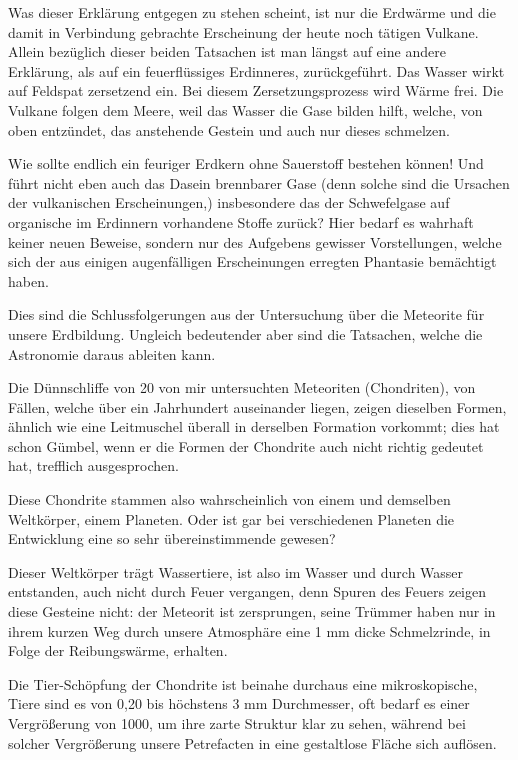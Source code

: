\documentclass[a4paper, 12pt, oneside]{article}
\begin{document}
Was dieser Erklärung entgegen zu stehen scheint, ist nur die Erdwärme und die damit in Verbindung gebrachte Erscheinung der heute noch tätigen Vulkane. Allein bezüglich dieser beiden Tatsachen ist man längst auf eine andere Erklärung, als auf ein feuerflüssiges Erdinneres, zurückgeführt. Das Wasser wirkt auf Feldspat zersetzend ein. Bei diesem Zersetzungsprozess wird Wärme frei. Die Vulkane folgen dem Meere, weil das Wasser die Gase bilden hilft, welche, von oben entzündet, das anstehende Gestein und auch nur dieses schmelzen.

Wie sollte endlich ein feuriger Erdkern ohne Sauerstoff bestehen können! Und führt nicht eben auch das Dasein brennbarer Gase (denn solche sind die Ursachen der vulkanischen Erscheinungen,) insbesondere das der Schwefelgase auf organische im Erdinnern vorhandene Stoffe zurück? Hier bedarf es wahrhaft keiner neuen Beweise, sondern nur des Aufgebens gewisser Vorstellungen, welche sich der aus einigen augenfälligen Erscheinungen erregten Phantasie bemächtigt haben.

Dies sind die Schlussfolgerungen aus der Untersuchung über die Meteorite für unsere Erdbildung. Ungleich bedeutender aber sind die Tatsachen, welche die Astronomie daraus ableiten kann.

Die Dünnschliffe von 20 von mir untersuchten Meteoriten (Chondriten), von Fällen, welche über ein Jahrhundert auseinander liegen, zeigen dieselben Formen, ähnlich wie eine Leitmuschel überall in derselben Formation vorkommt; dies hat schon Gümbel, wenn er die Formen der Chondrite auch nicht richtig gedeutet hat, trefflich ausgesprochen.

Diese Chondrite stammen also wahrscheinlich von einem und demselben Weltkörper, einem Planeten. Oder ist gar bei verschiedenen Planeten die Entwicklung eine so sehr übereinstimmende gewesen?

Dieser Weltkörper trägt Wassertiere, ist also im Wasser und durch Wasser entstanden, auch nicht durch Feuer vergangen, denn Spuren des Feuers zeigen diese Gesteine nicht: der Meteorit ist zersprungen, seine Trümmer haben nur in ihrem kurzen Weg durch unsere Atmosphäre eine 1 mm dicke Schmelzrinde, in Folge der Reibungswärme, erhalten.

Die Tier-Schöpfung der Chondrite ist beinahe durchaus eine mikroskopische, Tiere sind es von 0,20 bis höchstens 3 mm Durchmesser, oft bedarf es einer Vergrößerung von 1000, um ihre zarte Struktur klar zu sehen, während bei solcher Vergrößerung unsere Petrefacten in eine gestaltlose Fläche sich auflösen.
\end{document}
